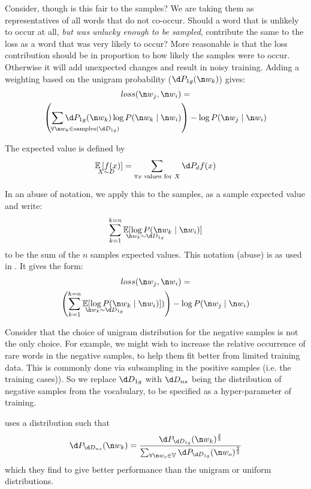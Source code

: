 {Consider, though is this fair to the samples?
We are taking them as representatives of all words that do not co-occur.
Should a word that is unlikely to occur at all, \emph{but was unlucky enough to be sampled}, contribute the same to the loss as a word that was very likely to occur?
More reasonable is that the loss contribution should be in proportion to how likely the samples were to occur.
Otherwise it will add unexpected changes and result in noisy training.
Adding a weighting based on the unigram probability ($\d P_{1g}(\n w_k)$) gives:
%
\begin{multline}
loss(\n w_j,\n w_i) = \\
\left(\sum_{\mathrlap{\!\!\!\!\!\!\forall \n w_k \in \text{samples}(\d D_{1g})}}
\d P_{1g}(\n w_k) \log P(\n w_k\mid \n w_i) \right)
-\log P(\n w_j\mid \n w_i)
\end{multline}


The expected value is defined by
\begin{equation}
\expected_{X \sim D} \left[ f(x) \right]= \sum_{\text{$\forall x$ values for $X$}} \d P_d f(x)
\end{equation}

In an abuse of notation, we apply this to the samples, as a sample expected value and write:
\begin{equation}
	\sum_{k=1}^{k=n} \expected_{\n w_k \sim \d D_{1g}} [\log P(\n w_k\mid \n w_i)]
\end{equation}
to be the sum of the $n$ samples expected values.
This notation (abuse) is as used in .
It gives the form:
\begin{multline}
loss(\n w_j,\n w_i) = \\
\left(\sum_{k=1}^{k=n} \expected_{\n w_k \sim \d D_{1g}} [\log P(\n w_k\mid \n w_i)]) \right)
-\log P(\n w_j\mid \n w_i)
\end{multline}

Consider that the choice of unigram distribution for the negative samples is not the only choice.
For example, we might wish to increase the relative occurrence of rare words in the negative samples, to help them fit better from limited training data.
This is commonly done via subsampling in the positive samples (i.e. the training cases)).
So we replace $\d D_{1g}$ with $\d D_{ns}$ being the distribution of negative samples from the vocabulary,
to be specified as a hyper-parameter of training.

\textcite{mikolovSkip} uses a distribution such that 
\begin{equation}
\d P_{\d D_{ns}}(\n w_k) =  \frac{\d P_{\d D_{1g}}(\n w_k)^{\frac{2}{3}}}{\sum_{\forall \n w_o\in \set{V}} \d P_{\d D_{1g}}(\n w_o)^{\frac{2}{3}}}
\end{equation}
which they find to give better performance than the unigram or uniform distributions.

}
